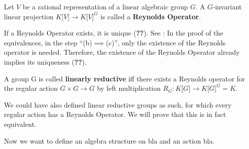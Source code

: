 \begin{definition}
  Let $ V $ be a rational representation of a linear algebraic group $ G $.
  A $ G $-invariant linear projection $ K\lbrack V\rbrack \longrightarrow K\lbrack V\rbrack^G $ is called a \textbf{Reynolds Operator}.
\end{definition}

\begin{remark}\label{unique}
  If a Reynolds Operator exists, it is unique (\textbf{??}).
  See \cite[p.39f]{DK15}: In the proof of the equivalences, in the step ``(b)$\implies$(c)'', only the existence of the Reynolds operator is needed.
  Therefore, the existence of the Reynolds Operator already implies its uniqueness (\textbf{??}).
\end{remark}

\begin{definition}
  A group G is called \textbf{linearly reductive} iff there exists a Reynolds operator for the regular action $ G \times G \longrightarrow G $ by left multiplication $ R_G \colon K\lbrack G \rbrack \longrightarrow K\lbrack G \rbrack^G = K $.
\end{definition}

\begin{remark}
  We could have also defined linear reductive groups as such, for which every regular action has a Reynolds Operator.
  We will prove that this is in fact equivalent.
\end{remark}

Now we want to define an algebra structure on bla and an action bla.

